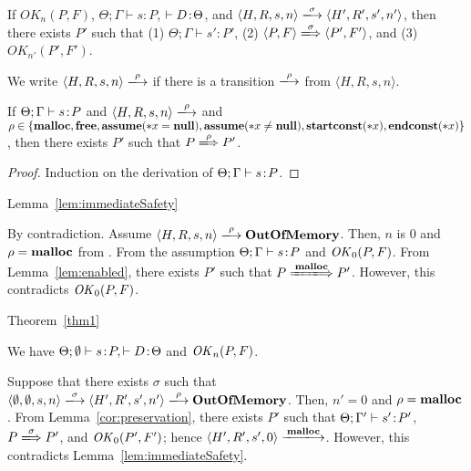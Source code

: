 \begin{corollary}
\label{cor:preservation}
If $OK_{n}(P, F)$, $\Theta; \Gamma \vdash s : P$, \(\vdash D \!:\!
\Theta\), and $\langle H,R,s,n\rangle \xlongrightarrow{\sigma} \langle
H',R',s', n' \rangle$, then there exists $P'$ such that (1) $ \Theta;
\Gamma \vdash s' : P'$, (2) \( \langle P, F \rangle
\xLongrightarrow{\sigma} \langle P', F' \rangle\), and (3)
\(OK_{n'}(P', F')\).
\end{corollary}

We write \(\langle H, R, s, n \rangle \xlongrightarrow{\rho}\) if
there is a transition \(\xlongrightarrow{\rho}\) from \(\langle H, R,
s, n \rangle\).

\begin{lemma}
\label{lem:enabled}
If \(\Theta; \Gamma \vdash s \!:\! P\) and \(\langle H, R, s, n \rangle
\xlongrightarrow{\rho}\) and \(\rho \in \{\mathbf{malloc}, \mathbf{free}, \mathbf{assume}(*x = \mathbf{null}), \mathbf{assume}(*x \ne \mathbf{null}), \mathbf{startconst}(*x), \mathbf{endconst}(*x)\}\), then
there exists \(P'\) such that \(P \xLongrightarrow{\rho} P'\).
\end{lemma}

\begin{proof}
Induction on the derivation of \(\Theta; \Gamma \vdash s \!:\! P\).
\end{proof}

\begin{pfof}{Lemma~\ref{lem:immediateSafety}}

By contradiction.  Assume \(\langle H, R, s, n \rangle
\xlongrightarrow{\rho} \OVERFLOW\). Then, \(n\) is \(0\) and \(\rho =
\mathbf{malloc}\) from .  From the assumption \(\Theta;\Gamma
\vdash s \!:\! P\) and \(\mathit{OK}_0(P, F)\).  From Lemma~\ref{lem:enabled},
there exists \(P'\) such that \(P \xLongrightarrow{\Malloc} P'\).
However, this contradicts \(\mathit{OK}_0(P, F)\).


\end{pfof}


\begin{pfof}{Theorem~\ref{thm1}}

We have \(\Theta;\emptyset \vdash s\!:\! P, \vdash D\!:\! \Theta\) and
\(\mathit{OK}_n(P, F)\).

Suppose that there exists \(\sigma\) such that \(\langle \emptyset,
\emptyset, s, n\rangle \xlongrightarrow{\sigma} \langle H', R', s',
n'\rangle \xlongrightarrow{\rho} \OVERFLOW\).  Then, \(n' = 0\) and
\(\rho = \mathbf{malloc}\).  From Lemma~\ref{cor:preservation}, there exists
\(P'\) such that \(\Theta; \Gamma' \vdash s' \!:\! P'\), \(P
\xLongrightarrow{\sigma} P'\), and \(\mathit{OK}_0(P', F')\); hence \(\langle H',
R', s', 0\rangle \xlongrightarrow{\Malloc}\).  However, this
contradicts Lemma~\ref{lem:immediateSafety}.

\end{pfof}
